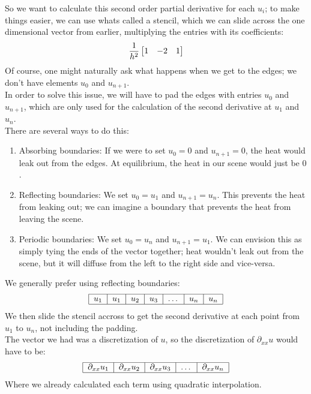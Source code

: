 \documentclass[12pt]{article}
\begin{document}
So we want to calculate this second order partial
derivative for each $u_i$;
to make things easier, we can use whats called
a stencil, which we can slide across the
one dimensional vector from earlier,
multiplying the entries with its coefficients:
\[ \dfrac{1}{h^2}\begin{bmatrix} 1 & -2 & 1 \end{bmatrix} \]
Of course, one might naturally ask what
happens when we get to the edges;
we don't have elements $u_{0}$ and $u_{n+1}$. \\

In order to solve this issue, we will have to pad the
edges with entries $u_{0}$ and $u_{n+1}$,
which are only used for the calculation
of the second derivative at $u_1$ and $u_{n}$. \\
There are several ways to do this:
\begin{enumerate}
    \item Absorbing boundaries:
    If we were to set $u_0 = 0$
    and $u_{n+1} = 0$,
    the heat would leak out from the edges.
    At equilibrium, the heat in our scene
    would just be $0$.
    \item Reflecting boundaries:
    We set $u_0 = u_1$ and $u_{n+1} = u_{n}$.
    This prevents the heat from leaking out;
    we can imagine a boundary that prevents the heat
    from leaving the scene.
    \item Periodic boundaries:
    We set $u_0 = u_n$ and $u_{n+1} = u_{1}$.
    We can envision this as simply tying the ends
    of the vector together; heat wouldn't leak out
    from the scene, but it will diffuse from the
    left to the right side and vice-versa.
\end{enumerate}
We generally prefer using reflecting boundaries:
\[
    \begin{tabular}{|c|c|c|c|c|c|c|}
    \hline
    $u_1$ & $u_1$ & $u_2$ & $u_3$ & 
    $\dots$ & $u_n$ & $u_n$ \\
    \hline
    \end{tabular}
\]
We then slide the stencil accross to
get the second derivative at each point
from $u_1$ to $u_n$, not including the padding. \\

The vector we had was a discretization of $u$,
so the discretization of $\partial_{xx} u$
would have to be:
\[
    \begin{tabular}{|c|c|c|c|c|}
    \hline
    $\partial_{xx} u_1$ & $\partial_{xx} u_2$ 
    & $\partial_{xx} u_3$ & 
    $\dots$ & $\partial_{xx} u_n$ \\
    \hline
    \end{tabular}
\]
Where we already calculated each term using
quadratic interpolation. \\
\end{document}
